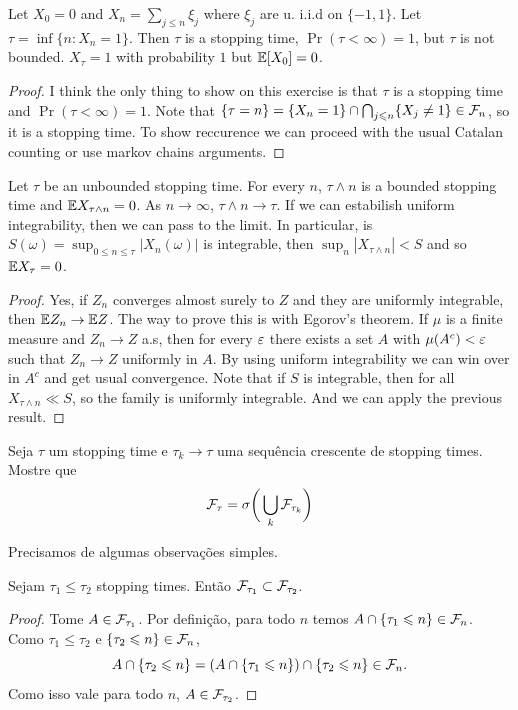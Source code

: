 \begin{exercise}[5.11]
	Let $X_0 = 0$ and $X_n = \sum_{j \leq n} \xi_j$ where $\xi_j$ are u.
	i.i.d on $\{-1,1\}$.
	Let $\tau = \inf\{n : X_n = 1\}$. Then $\tau$ is a stopping time,
	$\Pr(\tau < \infty) = 1$,
	but $\tau$ is not bounded. $X_\tau = 1$ with probability $1$ but
	$\mathbb{E}[X_0] = 0$.
\end{exercise}
\begin{proof}
	I think the only thing to show on this exercise is that $\tau$ is a
	stopping time and
	$\Pr(\tau < \infty) = 1$. Note that $\{\tau = n\} = \{X_n = 1\}
	\cap \bigcap_{j \leqslant n} \{X_j \neq 1\} \in \mathcal{F}_n$,
	so it is a stopping time. To show reccurence we can proceed with the usual
	Catalan counting or use markov chains arguments.
\end{proof}

\begin{exercise}[5.12]
	Let $\tau$ be an unbounded stopping time. For every $n$, $\tau
	\land n$ is a bounded stopping time
	and $\mathbb{E} X_{\tau \land n} = 0$. As $n \to \infty$, $\tau \land n
	\to \tau$. If we
	can estabilish uniform integrability, then we can pass to the limit.
	In particular,
	is $S(\omega) = \sup_{0 \leq n \leq \tau} |X_n(\omega)|$ is
	integrable, then $\sup_n |X_{\tau \land n}| < S$
	and so $\mathbb{E} X_\tau = 0$.
\end{exercise}

\begin{proof}
	Yes, if $Z_n$ converges almost surely to $Z$ and they are uniformly
	integrable, then $\mathbb{E} Z_n \rightarrow \mathbb{E} Z$.
	The way to prove this is with Egorov's theorem. If $\mu$ is a
	finite measure and $Z_n \to Z$ a.s,
	then for every $\varepsilon$ there exists a set $A$ with $\mu(A^c) < \varepsilon$
	such that $Z_n \to Z$ uniformly in $A$.
	By using uniform integrability we can win over in $A^c$ and get
	usual convergence.
	Note that if $S$ is integrable, then for all $X_{\tau \land n} \ll
	S$, so the family is uniformly integrable.
	And we can apply the previous result.
\end{proof}

\begin{exercise} [5.14]
	Seja $\tau$ um stopping time e $\tau_k \to \tau$ uma sequência crescente
	de stopping times. Mostre que
	\[
		\mathcal{F}_\tau = \sigma\bigg(\bigcup_k \mathcal{F}_{\tau_k}\bigg)
	\]
\end{exercise}

Precisamos de algumas observações simples.

\begin{lemma}
	Sejam $\tau_1 \leq \tau_2$ stopping times. Então $\mathcal{F}_{\tau_1}
	\subset \mathcal{F}_{\tau_2}$.
\end{lemma}
\begin{proof}
	Tome $A \in \mathcal{F}_{\tau_1}$. Por definição, para todo $n$ temos
	$A \cap \{\tau_1 \leqslant n\} \in \mathcal{F}_n$. Como $\tau_1 \leq \tau_2$ e
	$\{\tau_2 \leqslant n\} \in \mathcal{F}_n$,
	\[
		A \cap \{\tau_2 \leqslant n\} = (A \cap \{\tau_1 \leqslant n\}) \cap \{\tau_2
		\leqslant n\} \in \mathcal{F}_n .
	\]
	Como isso vale para todo $n$, $A \in \mathcal{F}_{\tau_2}$.
\end{proof}

